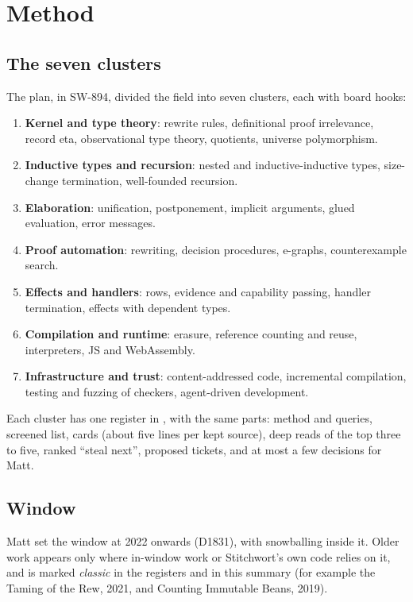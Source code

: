 \documentclass[11pt,a4paper]{article}
\newcommand{\file}[1]{\path{#1}}
\begin{document}
\section{Method}\label{sec:method}

\subsection{The seven clusters}

The plan, in SW-894, divided the field into seven clusters, each with board hooks:
\begin{enumerate}[label=\arabic*.]
  \item \textbf{Kernel and type theory}: rewrite rules, definitional proof irrelevance, record eta,
        observational type theory, quotients, universe polymorphism.
  \item \textbf{Inductive types and recursion}: nested and inductive-inductive types, size-change
        termination, well-founded recursion.
  \item \textbf{Elaboration}: unification, postponement, implicit arguments, glued evaluation,
        error messages.
  \item \textbf{Proof automation}: rewriting, decision procedures, e-graphs, counterexample search.
  \item \textbf{Effects and handlers}: rows, evidence and capability passing, handler
        termination, effects with dependent types.
  \item \textbf{Compilation and runtime}: erasure, reference counting and reuse, interpreters,
        JS and WebAssembly.
  \item \textbf{Infrastructure and trust}: content-addressed code, incremental compilation,
        testing and fuzzing of checkers, agent-driven development.
\end{enumerate}
Each cluster has one register in \file{docs/research/}, with the same parts: method and queries,
screened list, cards (about five lines per kept source), deep reads of the top three to five,
ranked ``steal next'', proposed tickets, and at most a few decisions for Matt.

\subsection{Window}

Matt set the window at 2022 onwards (D1831), with snowballing inside it. Older work appears only
where in-window work or Stitchwort's own code relies on it, and is marked \emph{classic} in the
registers and in this summary (for example the Taming of the Rew, 2021, and Counting Immutable
Beans, 2019).
\end{document}
